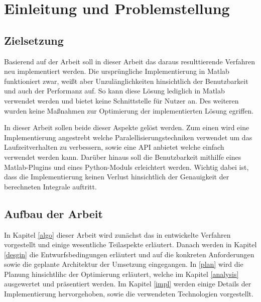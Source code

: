 \chapter{Einleitung und Problemstellung}


\section{Zielsetzung}

Basierend auf der Arbeit \cite{gasperini:hal-03209144} soll in dieser Arbeit das daraus resulttierende Verfahren neu implementiert werden.
Die ursprüngliche Implementierung in Matlab funktioniert zwar, weißt aber Unzulänglichkeiten hinsichtlich der Benutzbarkeit und auch der Performanz auf.
So kann diese Lösung lediglich in Matlab verwendet werden und bietet keine Schnittstelle für Nutzer an. Des weiteren wurden keine Maßnahmen zur Optimierung der implementierten Lösung egriffen.

In dieser Arbeit sollen beide dieser Aspekte gelöst werden. Zum einen wird eine Implementierung angestrebt welche Paralellisierungstechniken verwendet um das Laufzeitverhalten zu verbessern, sowie eine API anbietet welche einfach verwendet werden kann.
Darüber hinaus soll die Benutzbarkeit mithilfe eines Matlab-Plugins und eines Python-Moduls erleichtert werden.
Wichtig dabei ist, dass die Implementierung keinen Verlust hinsichtlich der Genauigkeit der berechneten Integrale auftritt.



\section{Aufbau der Arbeit}

In Kapitel \ref{algo} dieser Arbeit wird zunächst das in \cite{gasperini:hal-03209144} entwickelte Verfahren vorgestellt und einige wesentliche Teilaspekte erläutert.
Danach werden in Kapitel \ref{desgin} die Entwurfsbedingungen erläutert und auf die konkreten Anforderungen sowie die geplante Architektur der Umsetzung eingegangen.
In \ref{plan} wird die Planung hinsichtlihc der Optimierung erläutert, welche im Kapitel \ref{analysis} ausgewertet und präsentiert werden.
Im Kapitel \ref{impl} werden einige Details der Implementierung hervorgehoben, sowie die verwendeten Technologien vorgestellt.